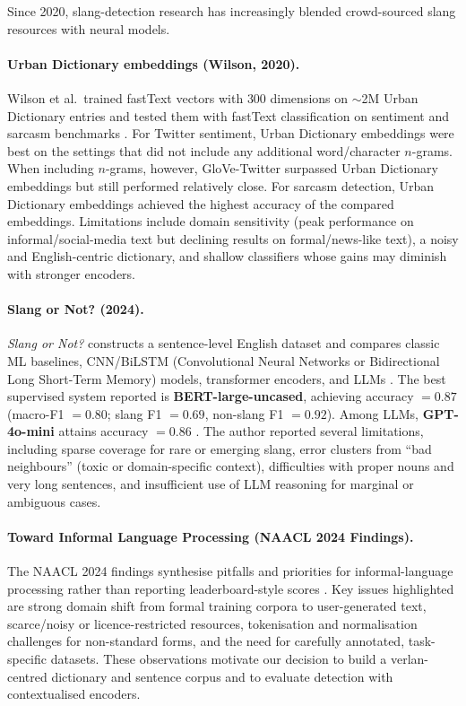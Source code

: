 \documentclass[12pt]{article}
\begin{document}
Since 2020, slang-detection research has increasingly blended crowd-sourced slang resources with neural models.

\paragraph{Urban Dictionary embeddings (Wilson, 2020).}
Wilson et al.\ trained fastText vectors with $300$ dimensions on $\sim$2M Urban Dictionary entries and tested them with fastText classification on sentiment and sarcasm benchmarks \cite{urban2020embeddings}. For Twitter sentiment, Urban Dictionary embeddings were best on the settings that did not include any additional word/character $n$-grams. When including $n$-grams, however, GloVe-Twitter surpassed Urban Dictionary embeddings but still performed relatively close. For sarcasm detection, Urban Dictionary embeddings achieved the highest accuracy of the compared embeddings. Limitations include domain sensitivity (peak performance on informal/social-media text but declining results on formal/news-like text), a noisy and English-centric dictionary, and shallow classifiers whose gains may diminish with stronger encoders. \cite{urban2020embeddings}


\paragraph{Slang or Not? (2024).}
\textit{Slang or Not?} constructs a sentence-level English dataset and compares classic ML baselines, CNN/BiLSTM (Convolutional Neural Networks or Bidirectional Long Short-Term Memory) models, transformer encoders, and LLMs \cite{slangornot2024}. The best supervised system reported is \textbf{BERT-large-uncased}, achieving accuracy $=0.87$ (macro-F1 $=0.80$; slang F1 $=0.69$, non-slang F1 $=0.92$). Among LLMs, \textbf{GPT-4o-mini} attains accuracy $=0.86$ \cite{slangornot2024}. The author reported several limitations, including sparse coverage for rare or emerging slang, error clusters from ``bad neighbours'' (toxic or domain-specific context), difficulties with proper nouns and very long sentences, and insufficient use of LLM reasoning for marginal or ambiguous cases. \cite{slangornot2024}

\paragraph{Toward Informal Language Processing (NAACL 2024 Findings).}
The NAACL 2024 findings synthesise pitfalls and priorities for informal-language processing rather than reporting leaderboard-style scores \cite{sun2024informal}. Key issues highlighted are strong domain shift from formal training corpora to user-generated text, scarce/noisy or licence-restricted resources, tokenisation and normalisation challenges for non-standard forms, and the need for carefully annotated, task-specific datasets. These observations motivate our decision to build a verlan-centred dictionary and sentence corpus and to evaluate detection with contextualised encoders. \cite{sun2024informal}
\end{document}
